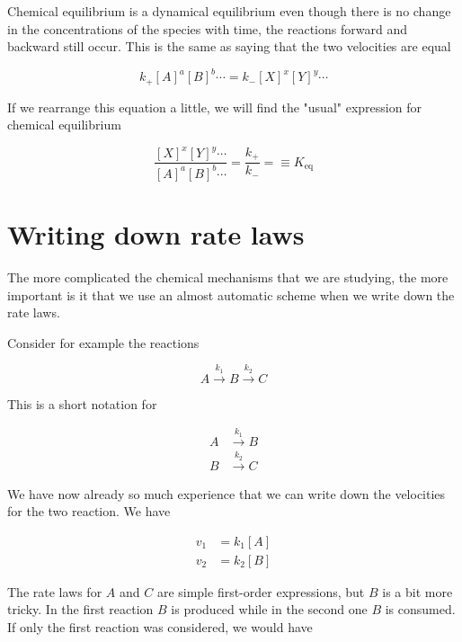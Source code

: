 Chemical equilibrium is a dynamical equilibrium \ie even though there is no change in the concentrations of the species with time, the reactions forward and backward still occur. This is the same as saying that the two velocities are equal \ie

\begin{equation}
    k_+ [A]^a[B]^b \cdots = k_- [X]^x[Y]^y \cdots
\end{equation}

If we rearrange this equation a little, we will find the "usual" expression for chemical equilibrium \ie

\begin{equation}
    \frac{[X]^x[Y]^y \cdots}{[A]^a[B]^b \cdots} = \frac{k_+}{k_-} = \equiv K_{\mathrm{eq}}
\end{equation}

\section{Writing down rate laws}

The more complicated the chemical mechanisms that we are studying, the more important is it that we use an almost automatic scheme when we write down the rate laws.

Consider for example the reactions

\begin{equation}
    A \overset{k_1}{\rightarrow} B \overset{k_2}{\rightarrow} C
\end{equation}

This is a short notation for

\begin{align*}
    A &\overset{k_1}{\rightarrow} B \\
    B &\overset{k_2}{\rightarrow} C
\end{align*}

We have now already so much experience that we can write down the velocities for the two reaction. We have

\begin{subequations}
    \begin{align}
        v_1 &= k_1 [A] \\
        v_2 &= k_2 [B]
    \end{align}
\end{subequations}

The rate laws for $A$ and $C$ are simple first-order expressions, but $B$ is a bit more tricky. In the first reaction $B$ is produced while in the second one $B$ is consumed. If only the first reaction was considered, we would have

